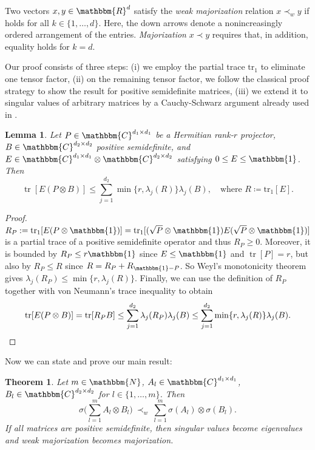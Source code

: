 \documentclass[12pt,reqno]{amsart}
\newtheorem*{theorem*}{Theorem}
\newtheorem*{lemma*}{Lemma}
\newcommand{\R}{\mathbbm{R}}
\newcommand{\C}{\mathbbm{C}}
\newcommand{\1}{\mathbbm{1}}
\newcommand{\tr}[1]{\operatorname{tr}\mathopen{}\left[#1\right]\mathclose{}} %
\newcommand{\Tr}{\mathrm{tr}}
\begin{document}
Two vectors $x,y\in\R^d$ satisfy the \emph{weak majorization} relation $x\prec_w y$ if  holds for all $k\in\{1,\ldots,d\}$. Here, the down arrows denote a nonincreasingly ordered arrangement of the entries. \emph{Majorization} $x\prec y$ requires that, in addition, equality holds for $k=d$.\vspace*{3pt}

Our proof consists of three steps: (i) we employ the partial trace $\Tr_1$ to eliminate one tensor factor, (ii) on the remaining tensor factor, we follow the classical proof strategy \cite{KyFan} to show the result for positive semidefinite matrices, (iii) we extend it to singular values of arbitrary matrices by a Cauchy-Schwarz argument already used in \cite{RicoWolf}. 
\begin{lemma*}\label{lemma} Let $P\in\C^{d_1\times d_1}$ be a Hermitian rank-$r$ projector, $B\in\C^{d_2\times d_2}$ positive semidefinite, and $E\in\C^{d_1\times d_1}\otimes \C^{d_2\times d_2}$ satisfying $0\leq E\leq \1$. Then
    \begin{equation}
        \tr{E(P\otimes B)}\leq\sum_{j=1}^{d_2}\min\{r,\lambda_j(R)\}\lambda_j(B),\quad\text{where } R\coloneq\Tr_1[E].
    \end{equation}
\end{lemma*}
\begin{proof}
      $R_P:=\Tr_1[E(P\otimes\1)]=\Tr_1[(\sqrt{P}\otimes\1)E(\sqrt{P}\otimes\1)]$ is a partial trace of a positive semidefinite operator and thus $R_P\geq 0$. Moreover, it is bounded by $R_P\leq r\1$ since $E\leq \1$ and $\tr{P}=r$, but also by $R_P\leq R$ since $R=R_P+R_{\1-P}$. So Weyl's monotonicity theorem \cite[Cor.\,III.2.3]{Bhatia} gives $\lambda_j(R_P)\leq\min\{r,\lambda_j(R)\}$. Finally, we can use the definition of $R_P$ together with von Neumann's trace inequality \cite[7.4.1]{horn13} to obtain
      $$\tr{E(P\otimes B)}=\tr{R_P B}\leq\sum_{j=1}^{d_2}\lambda_j(R_P)\lambda_j(B)\leq\sum_{j=1}^{d_2}\min\{r,\lambda_j(R)\}\lambda_j(B).\vspace*{-7pt}$$
\end{proof}
Now we can state and prove our main result:
\begin{theorem*}\label{theorem}
    Let $m\in\mathbbm{N}$, $A_l\in\C^{d_1\times d_1}$,  $B_l\in\C^{d_2\times d_2}$ for $l\in\{1,\ldots,m\}$. Then
    \begin{equation}\label{eq:main}
        \sigma\Big(\sum_{l=1}^m A_l\otimes B_l\Big)\ \prec_w\ \sum_{l=1}^m\sigma(A_l)\otimes\sigma(B_l).
    \end{equation}
    If all matrices are positive semidefinite, then singular values become eigenvalues and weak majorization becomes majorization.
\end{theorem*}
\end{document}
